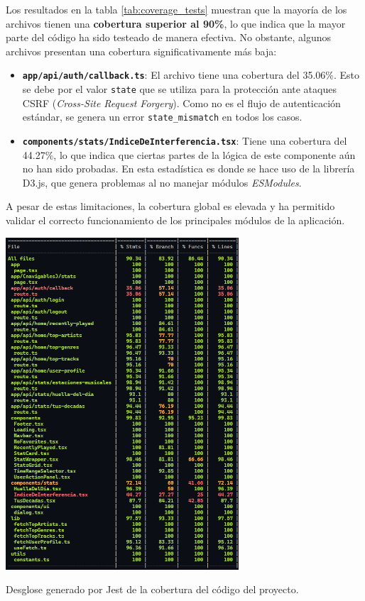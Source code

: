 Los resultados en la tabla \ref{tab:coverage_tests} muestran que la mayoría de los archivos tienen una \textbf{cobertura superior al 90\%}, lo que indica que la mayor parte del código ha sido testeado de manera efectiva. No obstante, algunos archivos presentan una cobertura significativamente más baja:

\begin{itemize}
    \item \textbf{\texttt{app/api/auth/callback.ts}}: El archivo tiene una cobertura del 35.06\%. Esto se debe por el valor \texttt{state} que se utiliza para la protección ante ataques CSRF (\textit{Cross-Site Request Forgery}). Como no es el flujo de autenticación estándar, se genera un error \texttt{state\_mismatch} en todos los casos.
    \item \textbf{\texttt{components/stats/IndiceDeInterferencia.tsx}}:  Tiene una cobertura del 44.27\%, lo que indica que ciertas partes de la lógica de este componente aún no han sido probadas. En esta estadística es donde se hace uso de la librería D3.js, que genera problemas al no manejar módulos \textit{ESModules}.
\end{itemize}

A pesar de estas limitaciones, la cobertura global es elevada y ha permitido validar el correcto funcionamiento de los principales módulos de la aplicación.

\begin{table}[htbp]
    \centering
    \includegraphics[width=0.65\textwidth]{figures/coverage_tests.png}
    \captionsetup{skip=7pt}
    \caption{Desglose generado por Jest de la cobertura del código del proyecto.}
    \label{tab:coverage_tests}
\end{table}


